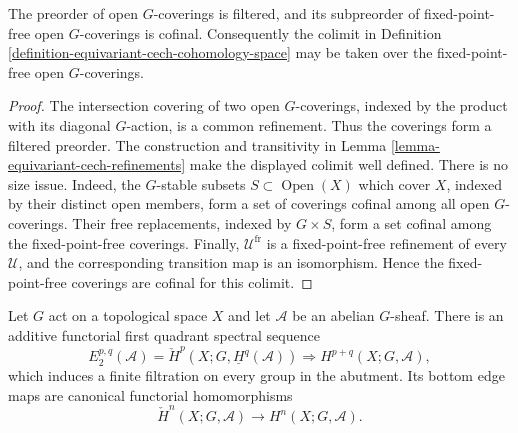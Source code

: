 \begin{lemma}
\label{lemma-equivariant-cech-free-coverings-cofinal}
The preorder of open $G$-coverings is filtered, and its subpreorder of
fixed-point-free open $G$-coverings is cofinal. Consequently the colimit
in Definition \ref{definition-equivariant-cech-cohomology-space} may be
taken over the fixed-point-free open $G$-coverings.
\end{lemma}

\begin{proof}
The intersection covering of two open $G$-coverings, indexed by the
product with its diagonal $G$-action, is a common refinement. Thus the
coverings form a filtered preorder. The construction and transitivity in
Lemma \ref{lemma-equivariant-cech-refinements} make the displayed colimit
well defined. There is no size issue. Indeed, the $G$-stable subsets
$S\subset \operatorname{Open}(X)$ which cover $X$, indexed by their
distinct open members, form a set of coverings cofinal among all open
$G$-coverings. Their free replacements, indexed by $G\times S$, form a
set cofinal among the fixed-point-free coverings. Finally,
$\mathcal U^{\mathrm{fr}}$ is a fixed-point-free refinement of every
$\mathcal U$, and the corresponding transition map is an isomorphism.
Hence the fixed-point-free coverings are cofinal for this colimit.
\end{proof}

\begin{lemma}
\label{lemma-global-equivariant-cech-spectral-sequence}
\begin{reference}
\cite[Chapter V, \S 5.5, (5.5.14)--(5.5.15), p. 212]{Tohoku}
\end{reference}
Let $G$ act on a topological space $X$ and let $\mathcal A$ be an
abelian $G$-sheaf. There is an additive functorial first quadrant
spectral sequence
\begin{equation}
\label{equation-global-equivariant-cech-spectral-sequence}
E_2^{p,q}(\mathcal A)
=\check H^p(X;G,\underline H^q(\mathcal A))
\Longrightarrow H^{p+q}(X;G,\mathcal A),
\end{equation}
which induces a finite filtration on every group in the abutment. Its
bottom edge maps are canonical functorial homomorphisms
\begin{equation}
\label{equation-global-equivariant-cech-edge}
\check H^n(X;G,\mathcal A)
\longrightarrow H^n(X;G,\mathcal A).
\end{equation}
\end{lemma}

